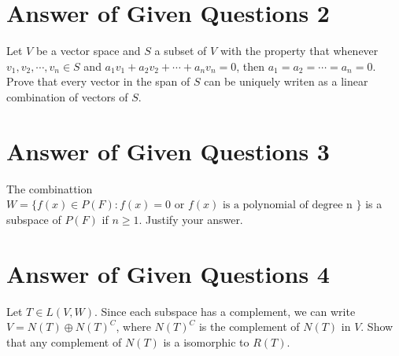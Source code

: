 \documentclass[10pt, oneside]{article}
\begin{document}
\section{Answer of Given Questions 2}

Let $V$ be a vector space and $S$ a subset of $V$ with the property that whenever $v_1, v_2, \cdots, v_n \in S$ and $a_1 v_1 + a_2 v_2 + \cdots + a_n v_n = 0$,
then $a_1 = a_2 = \cdots = a_n = 0$. Prove that every vector in the span of $S$ can be uniquely writen as a linear combination of vectors of $S$.

\section{Answer of Given Questions 3}
The combinattion $W= \{f(x) \in P(F): f(x) = 0 \text{ or } f(x) \text{ is a polynomial of degree n }\}$ is a subspace of $P(F)$ if $n \ge 1$. Justify your answer.

\section{Answer of Given Questions 4}
Let $T \in L(V, W)$. Since each subspace has a complement, we can write $V = N(T) \oplus N(T)^C$, where $N(T)^C$ is the complement of $N(T)$ in $V$. Show that any
complement of $N(T)$ is a isomorphic to $R(T)$.
\end{document}
